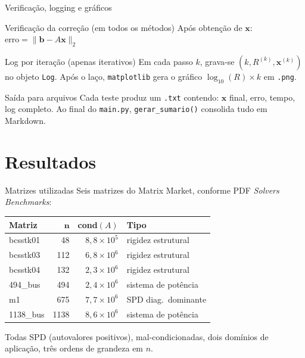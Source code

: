 \documentclass[10pt,aspectratio=169]{beamer}
\begin{document}
\begin{frame}{Verificação, logging e gráficos}
  \begin{block}{Verificação da correção (em todos os métodos)}
    Após obtenção de $\mathbf{x}$: \quad $\text{erro} = \|\mathbf{b} - A\mathbf{x}\|_2$
  \end{block}

  \begin{block}{Log por iteração (apenas iterativos)}
    Em cada passo $k$, grava-se $(k, R^{(k)}, \mathbf{x}^{(k)})$ no objeto \texttt{Log}.
    Após o laço, \texttt{matplotlib} gera o gráfico $\log_{10}(R) \times k$ em \texttt{.png}.
  \end{block}

  \begin{block}{Saída para arquivos}
    Cada teste produz um \texttt{.txt} contendo: $\mathbf{x}$ final, erro, tempo, log completo.
    Ao final do \texttt{main.py}, \texttt{gerar\_sumario()} consolida tudo em Markdown.
  \end{block}
\end{frame}

\section{Resultados}

\begin{frame}{Matrizes utilizadas}
  Seis matrizes do \alert{Matrix Market}, conforme PDF \emph{Solvers Benchmarks}:

  \vspace{0.5em}
  \begin{table}
  \centering
  \small
  \begin{tabular}{lrrl}
    \toprule
    \textbf{Matriz} & $\boldsymbol{n}$ & \textbf{cond$(A)$} & \textbf{Tipo} \\
    \midrule
    bcsstk01  & 48   & $8{,}8 \times 10^{5}$ & rigidez estrutural \\
    bcsstk03  & 112  & $6{,}8 \times 10^{6}$ & rigidez estrutural \\
    bcsstk04  & 132  & $2{,}3 \times 10^{6}$ & rigidez estrutural \\
    494\_bus  & 494  & $2{,}4 \times 10^{6}$ & sistema de potência \\
    m1        & 675  & $7{,}7 \times 10^{6}$ & SPD diag.\ dominante \\
    1138\_bus & 1138 & $8{,}6 \times 10^{6}$ & sistema de potência \\
    \bottomrule
  \end{tabular}
  \end{table}

  \vspace{0.5em}
  Todas \alert{SPD} (autovalores positivos), \alert{mal-condicionadas}, dois domínios de aplicação, três ordens de grandeza em $n$.
\end{frame}
\end{document}
